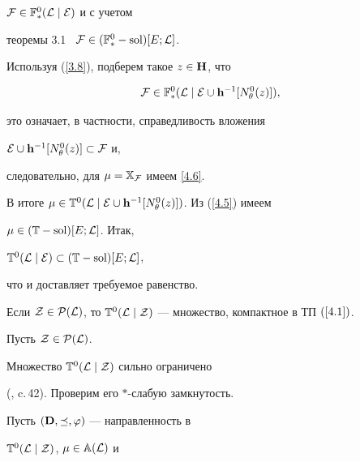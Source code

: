 {\begin{pf}
${\cal F} \in {{\Bbb F}_*^0}({\cal L}\mid{\cal E})$ и с учетом


теоремы 3.1 \ ${\cal F} \in ({{\Bbb F}_*^0}-\operatorname{sol})[E;{\cal L}]$.


Используя (\ref{3.8}), подберем такое $z \in {\bold H}$, что


$$


{\cal F} \in {{\Bbb F}_*^0}({\cal


L}\mid{\cal E}\cup{{\bold h}^{-1}}[{N_\theta^0}(z)]),


$$


это означает, в частности, справедливость вложения


${\cal E}\cup{{\bold h}^{-1}}[{N_\theta^0}(z)] \subset {\cal F}$ и, 


следовательно, для $\mu = {{\Bbb X}_{\cal F}}$ имеем \eqref{4.6}.


В итоге $\mu \in {{\Bbb T}^0}({\cal L}\mid{\cal E}\cup{{\bold


h}^{-1}}[{N_\theta^0}(z)])$. Из (\ref{4.5}) имеем


$\mu \in ({\Bbb T}-\operatorname{sol})[E;{\cal L}]$. Итак,


${{\Bbb T}^0}({\cal L}\mid{\cal E}) \subset ({\Bbb T}-\operatorname{sol})[E;{\cal L}]$,


что и доставляет требуемое равенство. 


\end{pf}








\begin{props}


Если ${\cal Z} \in {\cal P}({\cal L})$, то ${{\Bbb T}^0}({\cal


L}\mid{\cal Z})$ --- множество, компактное в ТП $(\ref{4.1})$.


\end{props}








\begin{pf}


Пусть ${\cal Z} \in {{\cal P}({\cal L})}$.


Множество ${{\Bbb T}^0}({\cal L}\mid{\cal Z})$ сильно ограничено


(\cite{6}, c.\,42). Проверим его $*$-слабую замкнутость.


Пусть $({\bold D},\preceq,\varphi)$ --- направленность в


${{\Bbb T}^0}({\cal L}\mid{\cal Z})$, $\mu \in {{\Bbb A}({\cal L})}$ и



\end{pf}}
